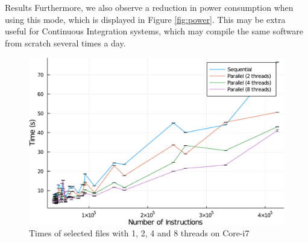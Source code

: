 \begin{subsection}{Results}
Furthermore, we also observe a reduction in power consumption when using this
mode, which is displayed in Figure \ref{fig:power}. This may be extra useful for Continuous Integration systems, which
may compile the same software from scratch several times a day.

\begin{table}[]
\caption{Speedup of highlighted files}
\label{table:files}
\end{table}

\begin{figure}
\includegraphics[scale=0.7]{figuras/times-insns-crop.pdf}
\caption{Times of selected files with 1, 2, 4 and 8 threads on Core-i7}
\label{fig:gcc_all_files}
\end{figure}


\end{subsection}
